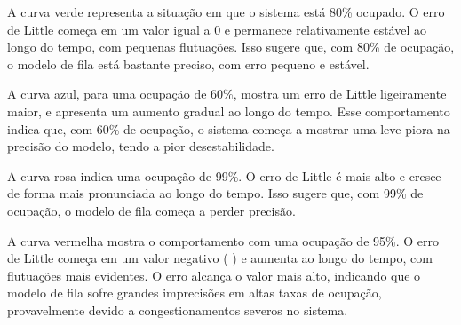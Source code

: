 A curva verde representa a situação em que o sistema está 80\% ocupado. O erro de Little começa em um valor igual a 0 e permanece relativamente estável ao longo do tempo, com pequenas flutuações. Isso sugere que, com 80\% de ocupação, o modelo de fila está bastante preciso, com erro pequeno e estável.

A curva azul, para uma ocupação de 60\%, mostra um erro de Little ligeiramente maior, e apresenta um aumento gradual ao longo do tempo. Esse comportamento indica que, com 60\% de ocupação, o sistema começa a mostrar uma leve piora na precisão do modelo, tendo a pior desestabilidade.

A curva rosa indica uma ocupação de 99\%. O erro de Little é mais alto e cresce de forma mais pronunciada ao longo do tempo. Isso sugere que, com 99\% de ocupação, o modelo de fila começa a perder precisão.

A curva vermelha mostra o comportamento com uma ocupação de 95\%. O erro de Little começa em um valor negativo (
 ) e aumenta ao longo do tempo, com flutuações mais evidentes. O erro alcança o valor mais alto, indicando que o modelo de fila sofre grandes imprecisões em altas taxas de ocupação, provavelmente devido a congestionamentos severos no sistema.
